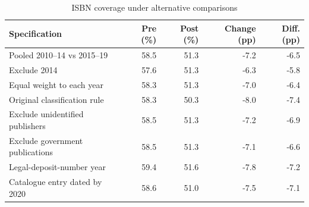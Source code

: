 \begin{table}[htbp]\centering\small
\caption{ISBN coverage under alternative comparisons}\label{tab:robust}
\begin{tabular}{p{.41\linewidth}rrrr}\toprule
Specification & Pre (\%) & Post (\%) & Change (pp) & Diff. (pp)\\\midrule
Pooled 2010--14 vs 2015--19 & 58.5 & 51.3 & -7.2 & -6.5\\
Exclude 2014 & 57.6 & 51.3 & -6.3 & -5.8\\
Equal weight to each year & 58.3 & 51.3 & -7.0 & -6.4\\
Original classification rule & 58.3 & 50.3 & -8.0 & -7.4\\
Exclude unidentified publishers & 58.5 & 51.3 & -7.2 & -6.9\\
Exclude government publications & 58.5 & 51.3 & -7.1 & -6.6\\
Legal-deposit-number year & 59.4 & 51.6 & -7.8 & -7.2\\
Catalogue entry dated by 2020 & 58.6 & 51.0 & -7.5 & -7.1\\
\bottomrule\end{tabular}
\end{table}
